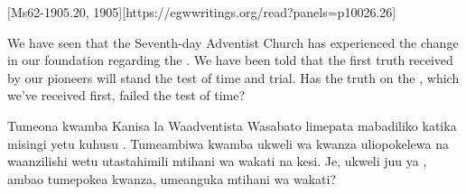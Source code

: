 [Ms62-1905.20, 1905][https://egwwritings.org/read?panels=p10026.26]


We have seen that the Seventh-day Adventist Church has experienced the change in our foundation regarding the . We have been told that the first truth received by our pioneers will stand the test of time and trial. Has the truth on the , which we’ve received first, failed the test of time?


Tumeona kwamba Kanisa la Waadventista Wasabato limepata mabadiliko katika misingi yetu kuhusu . Tumeambiwa kwamba ukweli wa kwanza uliopokelewa na waanzilishi wetu utastahimili mtihani wa wakati na kesi. Je, ukweli juu ya , ambao tumepokea kwanza, umeanguka mtihani wa wakati?


